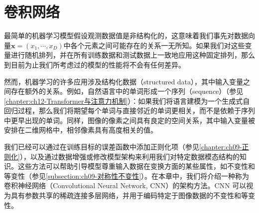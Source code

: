 \documentclass[../main.tex]{subfiles}
\begin{document}
\chapter{卷积网络}\label{chapter:ch10-卷积网络}

最简单的机器学习模型假设观测数据值是非结构化的，这意味着我们事先对数据向量$\mathbf{x}=(x_1,\cdots,x_D)$中各个元素之间可能存在的关系一无所知。如果我们对这些变量进行随机排列，并在所有训练数据和测试数据上一致地应用这种固定排列，那么到目前为止我们所考虑过的模型的性能将不会有任何差异。

然而，机器学习的许多应用涉及结构化数据（structured data），其中输入变量之间存在额外的关系。例如，自然语言中的单词形成一个序列（sequence）（参见\cref{chapter:ch12-Transformer与注意力机制}）：如果我们将语言建模为一个生成式自回归过程，那么我们将期望每个单词与直接邻近的单词更相关，而不是依赖于序列中更早出现的单词。同样，图像的像素之间具有良定的空间关系，其中输入变量被安排在二维网格中，相邻像素具有高度相关的值。

我们已经可以通过在训练目标的误差函数中添加正则化项（参见\cref{chapter:ch09-正则化}），以及通过数据增强或修改模型架构来利用我们对特定数据模态结构的知识。这些方法可以帮助引导模型尊重输入数据在变换方面的某些属性，如不变性和等变性（参见\cref{subsection:ch09-对称性不变性}）。在本章中，我们将介绍一种称为卷积神经网络（Convolutional Neural Network, CNN）的架构方法。CNN 可以视为具有参数共享的稀疏连接多层网络，并用于编码特定于图像数据的不变性和等变性。








\end{document}
